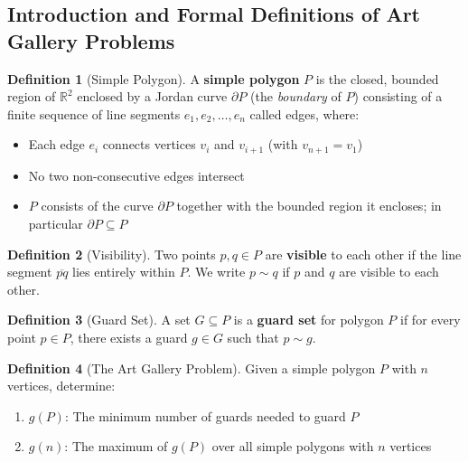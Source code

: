 \documentclass{article}
\theoremstyle{definition}
\newtheorem{definition}{Definition}
\begin{document}
\newtheorem{proposition}[theorem]{Proposition}

\theoremstyle{definition}


\subsection{Introduction and Formal Definitions of Art Gallery Problems}

\begin{definition}[Simple Polygon]
A \textbf{simple polygon} $P$ is the closed, bounded region of $\mathbb{R}^2$ enclosed by a Jordan curve $\partial P$ (the \emph{boundary} of $P$) consisting of a finite sequence of line segments $e_1, e_2, \ldots, e_n$ called edges, where:
\begin{itemize}[itemsep=0pt]
\item Each edge $e_i$ connects vertices $v_i$ and $v_{i+1}$ (with $v_{n+1} = v_1$)
\item No two non-consecutive edges intersect
\item $P$ consists of the curve $\partial P$ together with the bounded region it encloses; in particular $\partial P \subseteq P$
\end{itemize}
\end{definition}

\begin{definition}[Visibility]
Two points $p, q \in P$ are \textbf{visible} to each other if the line segment $\overline{pq}$ lies entirely within $P$. We write $p \sim q$ if $p$ and $q$ are visible to each other.
\end{definition}

\begin{definition}[Guard Set]
A set $G \subseteq P$ is a \textbf{guard set} for polygon $P$ if for every point $p \in P$, there exists a guard $g \in G$ such that $p \sim g$.
\end{definition}

\begin{definition}[The Art Gallery Problem]
Given a simple polygon $P$ with $n$ vertices, determine:
\begin{enumerate}[itemsep=0pt]
\item $g(P)$: The minimum number of guards needed to guard $P$
\item $g(n)$: The maximum of $g(P)$ over all simple polygons with $n$ vertices
\end{enumerate}
\end{definition}
\end{document}
